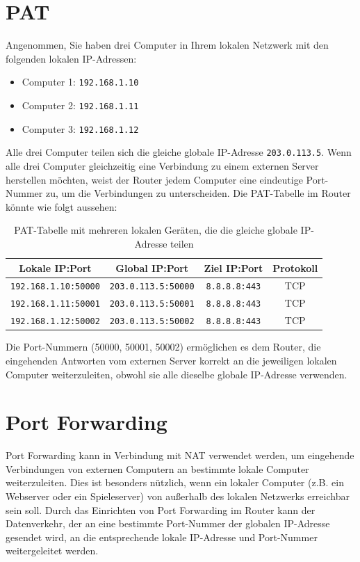 \section{\texorpdfstring{\acrfull{PAT}}{Port Address Translation (PAT)}}
\begin{myexample}
Angenommen, Sie haben drei Computer in Ihrem lokalen Netzwerk mit den folgenden lokalen \gls{IP}-Adressen:
\begin{itemize}
    \item Computer 1: \texttt{192.168.1.10}
    \item Computer 2: \texttt{192.168.1.11}
    \item Computer 3: \texttt{192.168.1.12}
\end{itemize}
Alle drei Computer teilen sich die gleiche globale \gls{IP}-Adresse \texttt{203.0.113.5}. Wenn alle drei Computer gleichzeitig eine Verbindung zu einem externen Server herstellen möchten, weist der Router jedem Computer eine eindeutige Port-Nummer zu, um die Verbindungen zu unterscheiden. Die \gls{PAT}-Tabelle im Router könnte wie folgt aussehen:
\begin{table}[H]
    \centering
    \begin{tabular}{c|c|c|c}
        \textbf{Lokale IP:Port} & \textbf{Global IP:Port} & \textbf{Ziel IP:Port} & \textbf{Protokoll} \\
        \midrule\midrule
        \texttt{192.168.1.10:50000} & \texttt{203.0.113.5:50000} & \texttt{8.8.8.8:443} & \gls{TCP} \\
        \midrule
        \texttt{192.168.1.11:50001} & \texttt{203.0.113.5:50001} & \texttt{8.8.8.8:443} & \gls{TCP} \\
        \midrule
        \texttt{192.168.1.12:50002} & \texttt{203.0.113.5:50002} & \texttt{8.8.8.8:443} & \gls{TCP} \\
    \end{tabular}
    \caption{\gls{PAT}-Tabelle mit mehreren lokalen Geräten, die die gleiche globale \gls{IP}-Adresse teilen}
\end{table}
Die Port-Nummern (50000, 50001, 50002) ermöglichen es dem Router, die eingehenden Antworten vom externen Server korrekt an die jeweiligen lokalen Computer weiterzuleiten, obwohl sie alle dieselbe globale \gls{IP}-Adresse verwenden.
\end{myexample}

\section{Port Forwarding}
Port Forwarding kann in Verbindung mit \gls{NAT} verwendet werden, um eingehende Verbindungen von externen Computern an bestimmte lokale Computer weiterzuleiten. Dies ist besonders nützlich, wenn ein lokaler Computer (z.B. ein Webserver oder ein Spieleserver) von außerhalb des lokalen Netzwerks erreichbar sein soll. Durch das Einrichten von Port Forwarding im Router kann der Datenverkehr, der an eine bestimmte Port-Nummer der globalen \gls{IP}-Adresse gesendet wird, an die entsprechende lokale \gls{IP}-Adresse und Port-Nummer weitergeleitet werden. 

